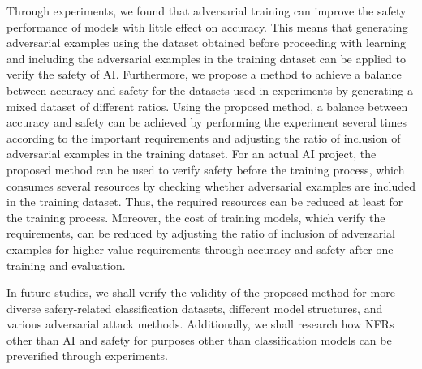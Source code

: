 \documentclass[journal,article,submit,moreauthors,pdftex]{Definitions/mdpi}
\begin{document}
Through experiments, we found that adversarial training can improve the safety performance of models with little effect on accuracy.
This means that generating adversarial examples using the dataset obtained before proceeding with learning and including the adversarial examples in the training dataset can be applied to verify the safety of AI.
Furthermore, we propose a method to achieve a balance between accuracy and safety for the datasets used in experiments by generating a mixed dataset of different ratios.
Using the proposed method, a balance between accuracy and safety can be achieved by performing the experiment several times according to the important requirements and adjusting the ratio of inclusion of adversarial examples in the training dataset.
For an actual AI project, the proposed method can be used to verify safety before the training process, which consumes several resources by checking whether adversarial examples are included in the training dataset.
Thus, the required resources can be reduced at least for the training process.
Moreover, the cost of training models, which verify the requirements, can be reduced by adjusting the ratio of inclusion of adversarial examples for higher-value requirements through accuracy and safety after one training and evaluation.

In future studies, we shall verify the validity of the proposed method for more diverse safery-related classification datasets, different model structures, and various adversarial attack methods.
Additionally, we shall research how NFRs other than AI and safety for purposes other than classification models can be preverified through experiments.

\vspace{6pt} 



\end{document}
